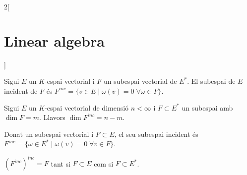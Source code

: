 \documentclass[../../../main.tex]{subfiles}
\begin{document}
\begin{multicols}{2}[\section{Linear algebra}]
\begin{definition}
\end{definition}
\begin{definition}
Sigui $E$ un $K$-espai vectorial i $F$ un subespai vectorial de $E^*$. El subespai de $E$ incident de $F$ és $F^{inc}=\{v\in E\mid \omega(v)=0\;\forall\omega\in F\}$.
\end{definition}
\begin{theorem}
Sigui $E$ un $K$-espai vectorial de dimensió $n<\infty$ i $F\subset E^*$ un subespai amb $\dim F=m$. Llavors $\dim F^{inc}=n-m$.
\end{theorem}
\begin{definition}
Donat un subespai vectorial i $F\subset E$, el seu subespai incident és $F^{inc}=\{\omega\in E^*\mid \omega(v)=0\;\forall v\in F\}$.
\end{definition}
\begin{prop}
$(F^{inc})^{inc}=F$ tant si $F\subset E$ com si $F\subset E^*$.
\end{prop}

\end{multicols}
\end{document}
